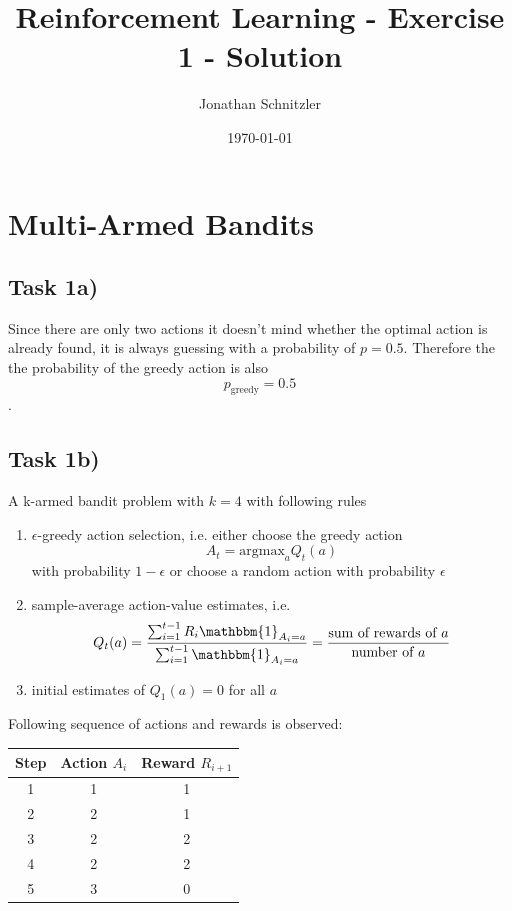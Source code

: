 \documentclass{article}
\title{Reinforcement Learning - Exercise 1 - Solution}
\author{Jonathan Schnitzler}
\date{\today}
\begin{document}
\maketitle
\section{Multi-Armed Bandits}

\subsection*{Task 1a)}

Since there are only two actions it doesn't mind whether the optimal action is already found, it is always guessing with a probability of $p=0.5$. Therefore the the probability of the greedy action is also 
$$p_{\text{greedy}} = 0.5$$.



\subsection*{Task 1b)}
A k-armed bandit problem with $k=4$ with following rules
\begin{enumerate}
    \item $\epsilon$-greedy action selection, i.e. either choose the greedy action 
    \begin{equation}
        A_t = \text{argmax}_a Q_t(a)
    \end{equation} with probability $1-\epsilon$ or choose a random action with probability $\epsilon$
    \item sample-average action-value estimates, i.e.
    \begin{equation}
        Q_t(a) = \frac{\sum_{i=1}^{t-1}R_i \mathbbm{1}_{A_i = a}}{\sum_{i=1}^{t-1} \mathbbm{1}_{A_i = a}} = \frac{\text{sum of rewards of $a$}}{\text{number of $a$}}
    \end{equation}
    \item initial estimates of $Q_1(a) = 0$ for all $a$
\end{enumerate}

Following sequence of actions and rewards is observed:
\begin{table}[H]
\centering
\begin{tabular}{|c|c|c|}
\hline
Step & Action $A_i$ & Reward $R_{i+1}$ \\ \hline
1 & 1 & 1 \\
2 & 2 & 1 \\
3 & 2 & 2 \\
4 & 2 & 2 \\
5 & 3 & 0 \\
\hline
\end{tabular}
\end{table}
\end{document}

